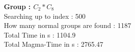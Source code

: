 \textbf{Group : $C_2*C_8$}\\
Searching up to index : 500\\
How many normal groups are found : 1187\\
Total Time in s : 1104.9\\
Total Magma-Time in s : 2765.47\\
